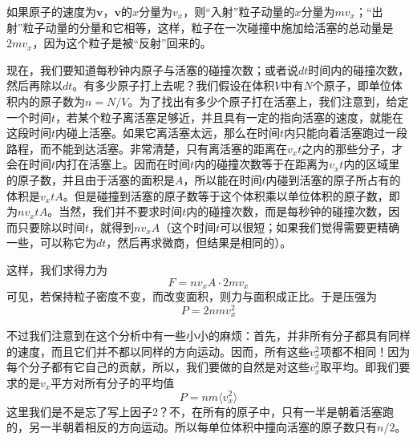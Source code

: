 如果原子的速度为$\boldsymbol{v}$，$\boldsymbol{v}$的$x$分量为$v_x$，则“入射”粒子动量的$x$分量为$mv_x$；“出射”粒子动量的分量和它相等，这样，粒子在一次碰撞中施加给活塞的总动量是$2mv_x$，因为这个粒子是被“反射”回来的。

现在，我们要知道每秒钟内原子与活塞的碰撞次数；或者说$dt$时间内的碰撞次数，然后再除以$dt$。有多少原子打上去呢？我们假设在体积$V$中有$N$个原子，即单位体积内的原子数为$n=N/V$。为了找出有多少个原子打在活塞上，我们注意到，给定一个时间$t$，若某个粒子离活塞足够近，并且具有一定的指向活塞的速度，就能在这段时间$t$内碰上活塞。如果它离活塞太远，那么在时间$t$内只能向着活塞跑过一段路程，而不能到达活塞。非常清楚，只有离活塞的距离在$v_xt$之内的那些分子，才会在时间$t$内打在活塞上。因而在时间$t$内的碰撞次数等于在距离为$v_xt$内的区域里的原子数，并且由于活塞的面积是$A$，所以能在时间$t$内碰到活塞的原子所占有的体积是$v_xtA$。但是碰撞到活塞的原子数等于这个体积乘以单位体积的原子数，即为$nv_xtA$。当然，我们并不要求时间$t$内的碰撞次数，而是每秒钟的碰撞次数，因而只要除以时间$t$，就得到$nv_xA$（这个时间$t$可以很短；如果我们觉得需要更精确一些，可以称它为$dt$，然后再求微商，但结果是相同的）。

这样，我们求得力为
\begin{equation}
    \label{Eq:I:39:3}
    F=nv_xA\cdot 2mv_x
\end{equation}
可见，若保持粒子密度不变，而改变面积，则力与面积成正比。于是压强为
\begin{equation}
    \label{Eq:I:39:4}
    P = 2nmv_x^2
\end{equation}

不过我们注意到在这个分析中有一些小小的麻烦：首先，并非所有分子都具有同样的速度，而且它们并不都以同样的方向运动。因而，所有这些$v_x^2$项都不相同！因为每个分子都有它自己的贡献，所以，我们要做的自然是对这些$v_x^2$取平均。即我们要求的是$v_x$平方对所有分子的平均值
\begin{equation}
    \label{Eq:I:39:5}
    P = nm\langle v_x^2 \rangle
\end{equation}
这里我们是不是忘了写上因子$2$？不，在所有的原子中，只有一半是朝着活塞跑的，另一半朝着相反的方向运动。所以每单位体积中撞向活塞的原子数只有$n/2$。

